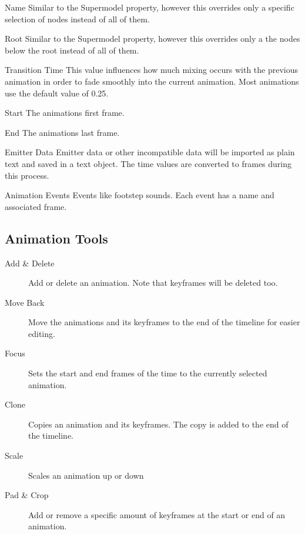 \begin{propertyAurora}{Name}
    Similar to the Supermodel property, however this overrides only a 
    specific selection of nodes instead of all of them.
\end{propertyAurora}

\begin{propertyAurora}{Root}
    Similar to the Supermodel property, however this overrides only a 
    the nodes below the root instead of all of them.
\end{propertyAurora}

\begin{propertyAurora}{Transition Time}
    This value influences how much mixing occurs with the previous animation in order to 
    fade smoothly into the current animation. Most animations use the default value of 0.25.
\end{propertyAurora}

\begin{propertyAurora}{Start}
    The animations first frame.
\end{propertyAurora}

\begin{propertyAurora}{End}
    The animations last frame.
\end{propertyAurora}

\begin{propertyAurora}{Emitter Data}
    Emitter data or other incompatible data will be imported as plain text and saved in a text object. The
    time values are converted to frames during this process.
\end{propertyAurora}

\begin{propertyAurora}{Animation Events}
    Events like footstep sounds. Each event has a name and associated frame.
\end{propertyAurora}

\subsection{Animation Tools}

\begin{description}
    \item[Add \& Delete] Add or delete an animation. Note that keyframes will be deleted too.
    \item[Move Back] Move the animations and its keyframes to the end of the timeline for easier editing.
    \item[Focus] Sets the start and end frames of the time to the currently selected animation.
    \item[Clone] Copies an animation and its keyframes. The copy is added to the end of the timeline.
    \item[Scale] Scales an animation up or down
    \item[Pad \& Crop] Add or remove a specific amount of keyframes at the start or end of an animation.
\end{description}
